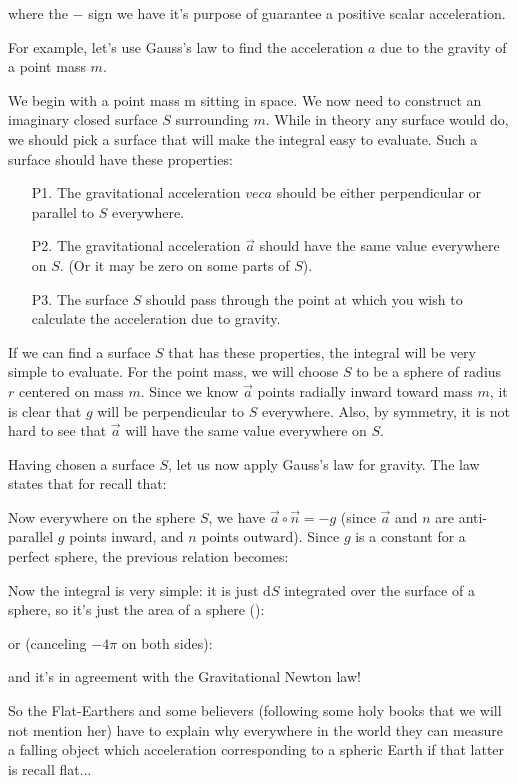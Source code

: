 	where the $-$ sign we have it's purpose of guarantee a positive scalar acceleration.
	
	For example, let's use Gauss's law to find the acceleration $a$ due to the gravity of a point mass $m$.

	We begin with a point mass m sitting in space. We now need to construct an imaginary closed surface $S$ surrounding $m$. While in theory any surface would do, we should pick a surface that will make the integral easy to evaluate. Such a surface should have these properties:
	\begin{enumerate}
		\item[P1.] The gravitational acceleration $vec{a}$ should be either perpendicular or parallel to $S$ everywhere.

		\item[P2.] The gravitational acceleration $\vec{a}$ should have the same value everywhere on $S$. (Or it may be zero on some parts of $S$).

		\item[P3.] The surface $S$ should pass through the point at which you wish to calculate the acceleration due to gravity.
	\end{enumerate}
	If we can find a surface $S$ that has these properties, the integral will be very simple to evaluate. For the point mass, we will choose $S$ to be a sphere of radius $r$ centered on mass $m$. Since we know $\vec{a}$ points radially
inward toward mass $m$, it is clear that $g$ will be perpendicular to $S$ everywhere. Also, by symmetry, it is not hard to see that $\vec{a}$ will have the same value everywhere on $S$. 

	Having chosen a surface $S$, let us now apply Gauss’s law for gravity. The law states that for recall that:
	
	Now everywhere on the sphere $S$, we have $\vec{a}\circ\vec{n}=-g$ (since $\vec{a}$ and $n$ are anti-parallel $g$ points inward, and $n$ points
outward). Since $g$ is a constant for a perfect sphere, the previous relation becomes:
	
	Now the integral is very simple: it is just $\mathrm{d}S$ integrated over the surface of a sphere, so it’s just the area of a sphere ():
	
	or (canceling $-4\pi$ on both sides):
	
	and it's in agreement with the Gravitational Newton law!
	
	So the Flat-Earthers and some believers (following some holy books that we will not mention her) have to explain why everywhere in the world they can measure a falling object which acceleration corresponding to a spheric Earth if that latter is recall flat...

